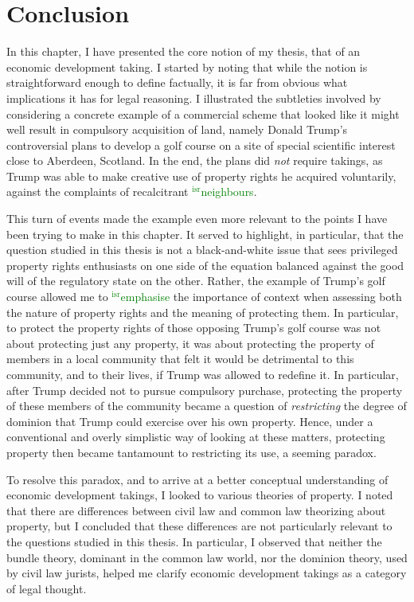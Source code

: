 \documentclass[12pt,a4paper]{book} %
\newcommand{\isr}[1]{\textcolor{green}{$^{\textrm{isr}}${#1}}}
\begin{document}
\section{Conclusion}

In this chapter, I have presented the core notion of my thesis, that of an economic development taking. I started by noting that while the notion is straightforward enough to define factually, it is far from obvious what implications it has for legal reasoning. I illustrated the subtleties involved by considering a concrete example of a commercial scheme that looked like it might well result in compulsory acquisition of land, namely Donald Trump's controversial plans to develop a golf course on a site of special scientific interest close to Aberdeen, Scotland. In the end, the plans did {\it not} require takings, as Trump was able to make creative use of property rights he acquired voluntarily, against the complaints of recalcitrant \isr{neighbours}.

This turn of events made the example even more relevant to the points I have been trying to make in this chapter. It served to highlight, in particular, that the question studied in this thesis is not a black-and-white issue that sees privileged property rights enthusiasts on one side of the equation balanced against the good will of the regulatory state on the other. Rather, the example of Trump's golf course allowed me to \isr{emphasise} the importance of context when assessing both the nature of property rights and the meaning of protecting them. In particular, to protect the property rights of those opposing Trump's golf course was not about protecting just any property, it was about protecting the property of members in a local community that felt it would be detrimental to this community, and to their lives, if Trump was allowed to redefine it. In particular, after Trump decided not to pursue compulsory purchase, protecting the property of these members of the community became a question of {\it restricting} the degree of dominion that Trump could exercise over his own property. Hence, under a conventional and overly simplistic way of looking at these matters, protecting property then became tantamount to restricting its use, a seeming paradox.

To resolve this paradox, and to arrive at a better conceptual understanding of economic development takings, I looked to various theories of property. I noted that there are differences between civil law and common law theorizing about property, but I concluded that these differences are not particularly relevant to the questions studied in this thesis. In particular, I observed that neither the bundle theory, dominant in the common law world, nor the dominion theory, used by civil law jurists, helped me clarify economic development takings as a category of legal thought.
\end{document}
